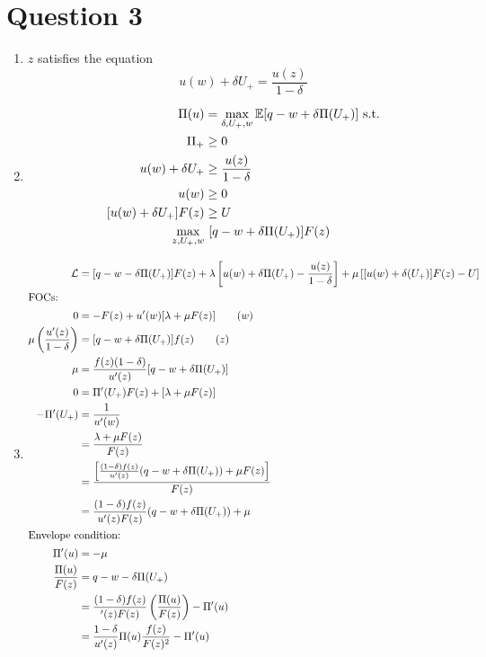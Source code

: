\section{Question 3}
\begin{enumerate}[label=\alph*)]
\item $z$ satisfies the equation
  \[
u(w) + \delta U_+ = \frac{u(z)}{1 - \delta}
\]
\item
  \begin{align*}
    \Pi(u) &= \max_{\delta, U_+, w} \mathbb{E}[q - w + \delta \Pi (U_+)] \text{ s.t.}\\
    \Pi_+ &\ge 0\\
    u(w) + \delta U_+ &\ge \frac{u(z)}{1 - \delta}\\
    u(w) &\ge 0\\
    [u(w) + \delta U_+]F(z) &\ge U\\
    \max_{z, U_+, w} &\ [q - w + \delta \Pi(U_+)] F(z)
  \end{align*}
\item
  \begin{align*}
    \mathcal{L} &= [q - w - \delta \Pi(U_+)]F(z) + \lambda \left[u(w) + \delta \Pi(U_+) - \frac{u(z)}{1 - \delta}\right] + \mu \left[[u(w) + \delta (U_+)] F(z) - U\right]\\
    \intertext{FOCs:}
    0 &= -F(z) + u^\prime(w)[\lambda + \mu F(z)] \tag{$w$}\\
    \mu \left(\frac{u^\prime(z)}{1 - \delta}\right) &= [q - w + \delta \Pi(U_+)]f(z)\tag{$z$}\\
    \mu &= \frac{f(z)(1 - \delta)}{u^\prime(z)}[q - w + \delta \Pi(U_+)]\\
    0 &= \Pi^\prime (U_+) F(z) + [\lambda + \mu F(z)]\\
    - \Pi^\prime (U_+) &= \frac{1}{u^\prime(w)}\\
                &= \frac{\lambda + \mu F(z)}{F(z)}\\
                &= \frac{\left[\frac{(1 - \delta)f(z)}{u^\prime(z)}(q - w + \delta \Pi(U_+)) + \mu F(z)\right]}{F(z)}\\
                &= \frac{(1 - \delta)f(z)}{u^\prime(z) F(z)} (q - w + \delta \Pi(U_+)) + \mu\\
    \intertext{Envelope condition:}
    \Pi^\prime (u) &= - \mu\\
    \frac{\Pi(u)}{F(z)} &= q - w - \delta \Pi(U_+)\\
                &= \frac{(1 - \delta)f(z)}{^\prime(z) F(z)}\left(\frac{\Pi(u)}{F(z)}\right) - \Pi^\prime (u)\\
    &= \frac{1 - \delta}{u^\prime(z)}\Pi(u) \frac{f(z)}{F(z)^2} - \Pi^\prime (u)
  \end{align*}
\end{enumerate}
